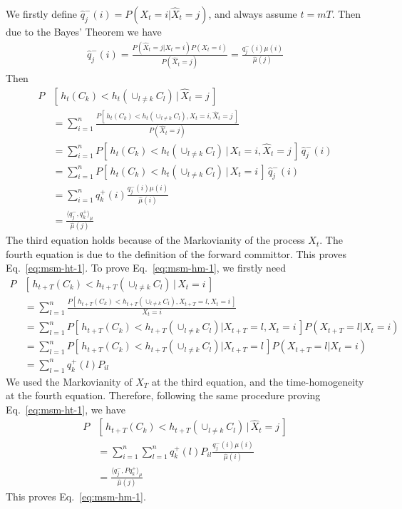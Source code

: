 \documentclass[aps, pre, preprint,unsortedaddress,a4paper,onecolumn]{revtex4}
\newcommand{\fwd}[0]{+}
\newcommand{\bwd}[0]{-}
\begin{document}
We firstly define $\hat q^\bwd_j (i) = P (X_t = i \vert \hat X_t =
j)$, and always assume $t = mT$. Then due to the Bayes' Theorem we have
\begin{align}
  \hat q^\bwd_j (i) =
  \frac{P (\hat X_t = j \vert X_t = i) P(X_t = i)}{ P(\hat X_t = j) } =
  \frac{q^\bwd_j(i) \mu(i)}{\hat \mu(j)}
\end{align}
Then
\begin{align*}
  P& [\,h_t(C_k) < h_t(\cup_{l\neq k} C_l) \,\vert\, \hat X_t = j\,]\\
  &=
  \sum_{i=1}^n
  \frac{P [\,h_t(C_k) < h_t(\cup_{l\neq k} C_l) , X_t = i, \hat X_t = j\,]}
  { P(\hat X_t = j )} \\
  &=
  \sum_{i=1}^n
  {P [\,h_t(C_k) < h_t(\cup_{l\neq k} C_l) \,\vert\, X_t = i, \hat X_t = j\,]}\,
  \hat q^\bwd_j(i) \\
  &=
  \sum_{i=1}^n
  {P [\,h_t(C_k) < h_t(\cup_{l\neq k} C_l) \,\vert\, X_t = i\,]}\,
  \hat q^\bwd_j(i)  \\
  &=
  \sum_{i=1}^n
  q^\fwd_k(i) \frac{q^\bwd_j(i) \mu(i)}{\hat \mu(i)} \\
  &=
  \frac{\langle q_j^\bwd, q_k^\fwd\rangle_\mu}{\hat \mu(j)}
\end{align*}
The third equation holds because of the Markovianity of the process $X_t$.
The fourth equation is due to the definition of the forward committor.
This proves Eq.~\eqref{eq:msm-ht-1}.
To prove Eq.~\eqref{eq:msm-hm-1}, we firstly need
\begin{align*}
  P & [\,h_{t+T}(C_k) < h_{t+T}(\cup_{l\neq k} C_l) \,\vert\, X_t = i\,]\\
  &=
  \sum_{l=1}^n
  \frac{P [\,h_{t+T}(C_k) < h_{t+T}(\cup_{l\neq k} C_l), X_{t+T} = l, X_t = i\,]}
  {X_t = i} \\
  &=
  \sum_{l=1}^n
  {P [\,h_{t+T}(C_k) < h_{t+T}(\cup_{l\neq k} C_l) \vert X_{t+T} = l, X_t = i\,]}
  {P( X_{t+T} = l \vert X_t = i)}\\
  & =
  \sum_{l=1}^n
  {P [\,h_{t+T}(C_k) < h_{t+T}(\cup_{l\neq k} C_l) \vert X_{t+T} = l\,]}
  {P( X_{t+T} = l \vert X_t = i)} \\
  &=
  \sum_{l=1}^n
  q^\fwd_k(l) P_{il}
\end{align*}
We used the Markovianity of $X_T$ at the third equation,
and the time-homogeneity at the fourth equation.
Therefore, following the same procedure proving Eq.~\eqref{eq:msm-ht-1}, we have
\begin{align*}
  P& [\,h_{t+T}(C_k) < h_{t+T}(\cup_{l\neq k} C_l) \,\vert\, \hat X_t = j\,]\\
  &=
  \sum_{i=1}^n\sum_{l=1}^n
  q^\fwd_k(l) P_{il}
  \frac{q^\bwd_j(i) \mu(i)}{\hat \mu(i)} \\
  &=
  \frac{\langle q_j^\bwd, P q_k^\fwd\rangle_\mu}{\hat \mu(j)}  
\end{align*}
This proves Eq.~\eqref{eq:msm-hm-1}.

{}

\end{document}
